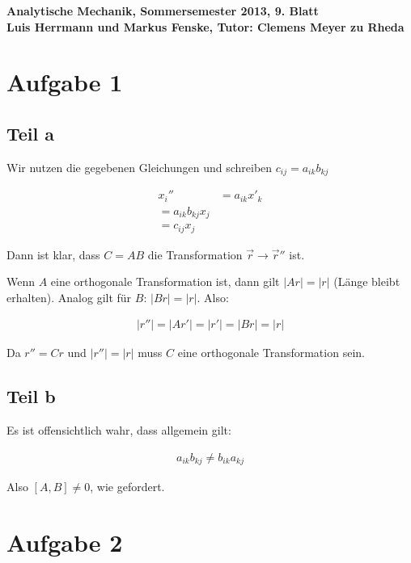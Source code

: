 \documentclass[a4paper,german,12pt,smallheadings]{scrartcl}
\begin{document}
\begin{center}
\bfseries %
\sffamily %
\vspace{-40pt}
Analytische Mechanik, Sommersemester 2013, 9. Blatt \\
Luis Herrmann und Markus Fenske, Tutor: Clemens Meyer zu Rheda
\vspace{-10pt}
\end{center}
\section*{Aufgabe 1}
\subsection*{Teil a}

Wir nutzen die gegebenen Gleichungen und schreiben $c_{ij} = a_{ik} b_{kj}$

\begin{align*}
  x_i'' &= a_{ik} x'_k \\
         = a_{ik} b_{kj} x_j \\
         = c_{ij} x_j
\end{align*}

Dann ist klar, dass $C = AB$ die Transformation $\vec{r} \to \vec{r}''$ ist.

Wenn $A$ eine orthogonale Transformation ist, dann gilt $|Ar| = |r|$ (Länge
bleibt erhalten). Analog gilt für $B$: $|Br| = |r|$. Also:

\begin{align*}
  |r''| = |Ar'| = |r'| = |Br| = |r|
\end{align*}

Da $r'' = Cr$ und $|r''| = |r|$ muss $C$ eine orthogonale Transformation sein.

\subsection*{Teil b}

Es ist offensichtlich wahr, dass allgemein gilt:

\begin{align*}
  a_{ik} b_{kj} \neq b_{ik} a_{kj}
\end{align*}

Also $[A,B] \neq 0$, wie gefordert.


\section*{Aufgabe 2}
\end{document}
